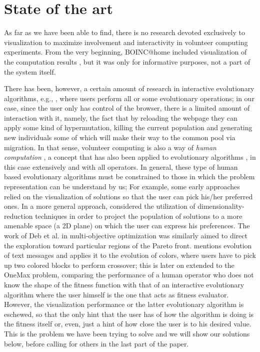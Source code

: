 \documentclass{sig-alternate}
\begin{document}
\section{State of the art}
\label{sec:soa}

As far as we have been able to find, there is no research devoted
exclusively to visualization to maximize involvement and interactivity
in volunteer computing experiments. From the very beginning,
BOINC@home included visualization of the computation results
\cite{anderson2006designing}, but it was only for informative
purposes, not a part of the system itself. 

There has been, however, a certain amount of research in interactive
evolutionary algorithms, e.g., \cite{takagi01interactive,parmee:human-centric2003,parmee08user-centric,badillo13usercentric}, 
where users perform all or some evolutionary
operations; in our case, since the
user only has control of the browser, there is a limited amount of
interaction with it, namely, the fact that by reloading the webpage they
can apply some kind of hypermutation, killing the current population and
generating new individuals some of which will make their way to the
common pool via migration. In that sense, volunteer computing is also
a way of {\em human computation} \cite{quinn2011human}, a concept that
has also been applied to evolutionary algorithms \cite{972056, Nickerson2013}, in
this case extensively and with all operators. In general, these type
of human based evolutionary algorithms must be constrained to those in
which the problem representation can be understand by us; 
For example, some early approaches 
\cite{Daw86} relied on the visualization of solutions so that the user can 
pick his/her preferred ones. In a more general approach, \cite{takagi-jcis2000} 
considered the utilization of dimensionality-reduction techniques in order
to project the population of solutions to a more amenable space (a 2D plane)
on which the user can express his preferences. The work of Deb et al. in
multi-objective optimization \cite{DC07,DK07} was similarly aimed to direct 
the exploration toward particular regions of the Pareto front.
\cite{cheng2004interactive} mentions evolution of text messages and
applies it to the evolution of colors, where users have to pick up two
colored blocks to perform crossover; this is later on extended to the
OneMax problem, comparing the performance of a human operator who does
not know the shape of the fitness function with that of an interactive
evolutionary algorithm where the user himself is the one that acts as
fitness evaluator.
However, the visualization performance or the latter evolutionary algorithm is
eschewed, so that the only hint
that the user has of how the algorithm is doing is the fitness itself
or, even, just a hint of how close the user is to his desired
value. This is the problem we have been trying to solve and we will
show our solutions below, before calling for others in the last part
of the paper. 
\end{document}
